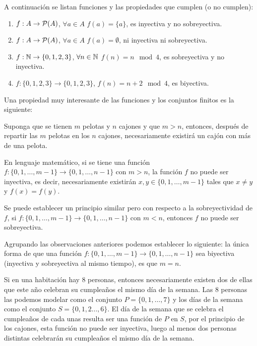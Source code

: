\begin{ejemplo}
A continuación se listan funciones y las propiedades que cumplen (o no cumplen):
\begin{enumerate}
  \itemsep 0pt
  \item $f:A\rightarrow\P(A)$, $\forall a\in A$ $f(a)=\{a\}$, es inyectiva y no sobreyectiva.
  \item $f:A\rightarrow\P(A)$, $\forall a\in A$ $f(a)=\emptyset$, ni inyectiva ni sobreyectiva.
  \item $f:\N\rightarrow\{0,1,2,3\}$, $\forall n\in\N$ $f(n)=n\mod 4$, es sobreyectiva y no inyectiva.
  \item $f:\{0,1,2,3\}\rightarrow\{0,1,2,3\}$, $f(n)=n+2\mod 4$, es biyectiva.
\end{enumerate}
\end{ejemplo}

Una propiedad muy interesante de las funciones y los conjuntos finitos es la siguiente:

\begin{teorema}
Suponga que se tienen $m$ pelotas y $n$ cajones y que $m>n$, entonces, después de repartir las $m$ pelotas en los $n$ cajones, necesariamente existirá un cajón con más de una pelota.

En lenguaje matemático, si se tiene una función $f:\{0,1,\ldots,m-1\}\rightarrow\{0,1,\ldots,n-1\}$ con $m>n$, la función $f$ no puede ser inyectiva, es decir, necesariamente existirán $x,y\in\{0,1,\ldots,m-1\}$ tales que $x\not=y$ y $f(x)=f(y)$.

Se puede establecer un principio similar pero con respecto a la sobreyectividad de $f$, si $f:\{0,1,\ldots,m-1\}\rightarrow\{0,1,\ldots,n-1\}$ con $m<n$, entonces $f$ no puede ser sobreyectiva.

Agrupando las observaciones anteriores podemos establecer lo siguiente: la única forma de que una función $f:\{0,1,\ldots,m-1\}\rightarrow\{0,1,\ldots,n-1\}$ sea biyectiva (inyectiva y sobreyectiva al mismo tiempo), es que $m=n$.
\end{teorema}

\begin{ejemplo}
Si en una habitación hay 8 personas, entonces necesariamente existen dos de ellas que este año celebran su cumpleaños el mismo día de la semana.
Las 8 personas las podemos modelar como el conjunto $P=\{0,1,\ldots,7\}$ y los días de la semana como el conjunto $S=\{0,1,2\ldots,6\}$. 
El día de la semana que se celebra el cumpleaños de cada unas resulta ser una función de $P$ en $S$, por el principio de los cajones, esta función no puede ser inyectiva, luego al menos dos personas distintas celebrarán su cumpleaños el mismo día de la semana.
\end{ejemplo}

